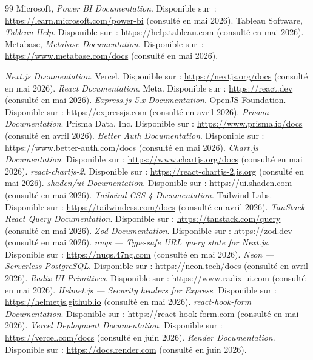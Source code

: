 \documentclass[11pt,a4paper]{report}
\begin{document}
\begin{thebibliography}{99}
 Microsoft, \emph{Power BI Documentation}. Disponible sur~: \url{https://learn.microsoft.com/power-bi} (consulté en mai 2026).
 Tableau Software, \emph{Tableau Help}. Disponible sur~: \url{https://help.tableau.com} (consulté en mai 2026).
 Metabase, \emph{Metabase Documentation}. Disponible sur~: \url{https://www.metabase.com/docs} (consulté en mai 2026).

 \emph{Next.js Documentation}. Vercel. Disponible sur : \url{https://nextjs.org/docs} (consulté en mai 2026).
 \emph{React Documentation}. Meta. Disponible sur : \url{https://react.dev} (consulté en mai 2026).
 \emph{Express.js 5.x Documentation}. OpenJS Foundation. Disponible sur : \url{https://expressjs.com} (consulté en avril 2026).
 \emph{Prisma Documentation}. Prisma Data, Inc. Disponible sur : \url{https://www.prisma.io/docs} (consulté en avril 2026).
 \emph{Better Auth Documentation}. Disponible sur : \url{https://www.better-auth.com/docs} (consulté en mai 2026).
 \emph{Chart.js Documentation}. Disponible sur : \url{https://www.chartjs.org/docs} (consulté en mai 2026).
 \emph{react-chartjs-2}. Disponible sur : \url{https://react-chartjs-2.js.org} (consulté en mai 2026).
 \emph{shadcn/ui Documentation}. Disponible sur : \url{https://ui.shadcn.com} (consulté en mai 2026).
 \emph{Tailwind CSS 4 Documentation}. Tailwind Labs. Disponible sur : \url{https://tailwindcss.com/docs} (consulté en avril 2026).
 \emph{TanStack React Query Documentation}. Disponible sur : \url{https://tanstack.com/query} (consulté en mai 2026).
 \emph{Zod Documentation}. Disponible sur : \url{https://zod.dev} (consulté en mai 2026).
 \emph{nuqs — Type-safe URL query state for Next.js}. Disponible sur : \url{https://nuqs.47ng.com} (consulté en mai 2026).
 \emph{Neon — Serverless PostgreSQL}. Disponible sur : \url{https://neon.tech/docs} (consulté en avril 2026).
 \emph{Radix UI Primitives}. Disponible sur : \url{https://www.radix-ui.com} (consulté en mai 2026).
 \emph{Helmet.js — Security headers for Express}. Disponible sur : \url{https://helmetjs.github.io} (consulté en mai 2026).
 \emph{react-hook-form Documentation}. Disponible sur : \url{https://react-hook-form.com} (consulté en mai 2026).
 \emph{Vercel Deployment Documentation}. Disponible sur : \url{https://vercel.com/docs} (consulté en juin 2026).
 \emph{Render Documentation}. Disponible sur : \url{https://docs.render.com} (consulté en juin 2026).
\end{thebibliography}
\end{document}
